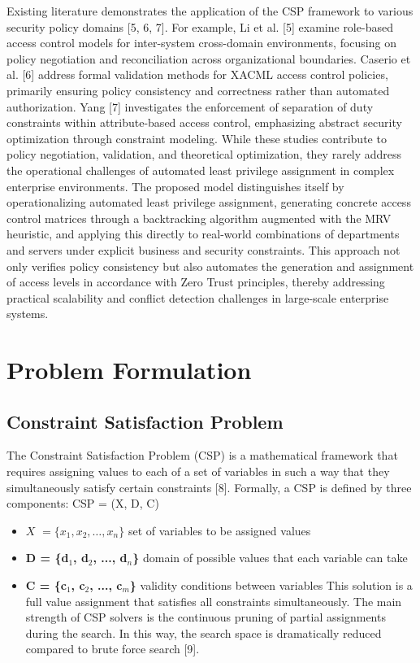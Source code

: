 \documentclass[conference]{IEEEtran}
\begin{document}
	Existing literature demonstrates the application of the CSP framework to various security policy domains [5, 6, 7]. For example, Li et al. [5] examine role-based access control models for inter-system cross-domain environments, focusing on policy negotiation and reconciliation across organizational boundaries. Caserio et al. [6] address formal validation methods for XACML access control policies, primarily ensuring policy consistency and correctness rather than automated authorization. Yang [7] investigates the enforcement of separation of duty constraints within attribute-based access control, emphasizing abstract security optimization through constraint modeling. While these studies contribute to policy negotiation, validation, and theoretical optimization, they rarely address the operational challenges of automated least privilege assignment in complex enterprise environments. The proposed model distinguishes itself by operationalizing automated least privilege assignment, generating concrete access control matrices through a backtracking algorithm augmented with the MRV heuristic, and applying this directly to real-world combinations of departments and servers under explicit business and security constraints. This approach not only verifies policy consistency but also automates the generation and assignment of access levels in accordance with Zero Trust principles, thereby addressing practical scalability and conflict detection challenges in large-scale enterprise systems.
	
	\section{Problem Formulation}
	\label{sec:problem}
	
	\subsection{Constraint Satisfaction Problem}
	The Constraint Satisfaction Problem (CSP) is a mathematical framework that requires assigning values to each of a set of variables in such a way that they simultaneously satisfy certain constraints [8]. Formally, a CSP is defined by three components:
    CSP = (X, D, C)

	\begin{itemize}
		\item \textbf{${X}$} $ = \{x_1, x_2, \ldots, x_n\}$ \quad set of variables to be assigned values
		\item \textbf{D = \{d$_1$, d$_2$, ..., d$_n$\} } domain of possible values that each variable can take
		\item \textbf{C = \{c$_1$, c$_2$, ..., c$_m$\} } validity conditions between variables
		This solution is a full value assignment that satisfies all constraints simultaneously. The main strength of CSP solvers is the continuous pruning of partial assignments during the search. In this way, the search space is dramatically reduced compared to brute force search [9].
	\end{itemize}
	
\end{document}
